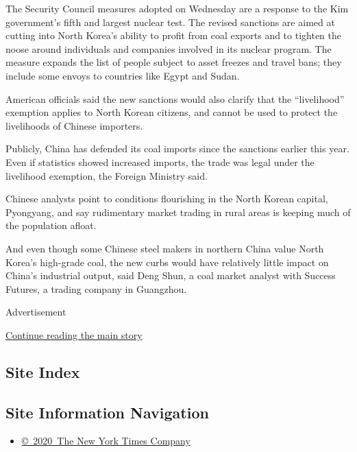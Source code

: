 The Security Council measures adopted on Wednesday are a response to the
Kim government's fifth and largest nuclear test. The revised sanctions
are aimed at cutting into North Korea's ability to profit from coal
exports and to tighten the noose around individuals and companies
involved in its nuclear program. The measure expands the list of people
subject to asset freezes and travel bans; they include some envoys to
countries like Egypt and Sudan.

American officials said the new sanctions would also clarify that the
``livelihood'' exemption applies to North Korean citizens, and cannot be
used to protect the livelihoods of Chinese importers.

Publicly, China has defended its coal imports since the sanctions
earlier this year. Even if statistics showed increased imports, the
trade was legal under the livelihood exemption, the Foreign Ministry
said.

Chinese analysts point to conditions flourishing in the North Korean
capital, Pyongyang, and say rudimentary market trading in rural areas is
keeping much of the population afloat.

And even though some Chinese steel makers in northern China value North
Korea's high-grade coal, the new curbs would have relatively little
impact on China's industrial output, said Deng Shun, a coal market
analyst with Success Futures, a trading company in Guangzhou.

Advertisement

\protect\hyperlink{after-bottom}{Continue reading the main story}

\hypertarget{site-index}{%
\subsection{Site Index}\label{site-index}}

\hypertarget{site-information-navigation}{%
\subsection{Site Information
Navigation}\label{site-information-navigation}}

\begin{itemize}
\tightlist
\item
  \href{https://help.nytimes.com/hc/en-us/articles/115014792127-Copyright-notice}{©~2020~The
  New York Times Company}
\end{itemize}

